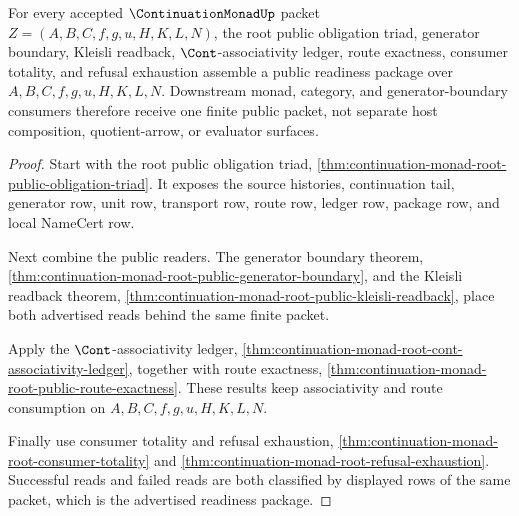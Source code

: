 \begin{theorem}
\label{thm:continuation-monad-root-public-readiness-package}
For every accepted $\ContinuationMonadUp$ packet
$Z=(A,B,C,f,g,u,H,K,L,N)$, the root public obligation triad, generator boundary,
Kleisli readback, $\Cont$-associativity ledger, route exactness, consumer
totality, and refusal exhaustion assemble a public readiness package over
$A,B,C,f,g,u,H,K,L,N$. Downstream monad, category, and generator-boundary
consumers therefore receive one finite public packet, not separate host
composition, quotient-arrow, or evaluator surfaces.
\end{theorem}
\begin{proof}
Start with the root public obligation triad,
\autoref{thm:continuation-monad-root-public-obligation-triad}. It exposes the
source histories, continuation tail, generator row, unit row, transport row,
route row, ledger row, package row, and local NameCert row.

Next combine the public readers. The generator boundary theorem,
\autoref{thm:continuation-monad-root-public-generator-boundary}, and the Kleisli
readback theorem, \autoref{thm:continuation-monad-root-public-kleisli-readback},
place both advertised reads behind the same finite packet.

Apply the $\Cont$-associativity ledger,
\autoref{thm:continuation-monad-root-cont-associativity-ledger}, together with
route exactness, \autoref{thm:continuation-monad-root-public-route-exactness}.
These results keep associativity and route consumption on
$A,B,C,f,g,u,H,K,L,N$.

Finally use consumer totality and refusal exhaustion,
\autoref{thm:continuation-monad-root-consumer-totality} and
\autoref{thm:continuation-monad-root-refusal-exhaustion}. Successful reads and
failed reads are both classified by displayed rows of the same packet, which is
the advertised readiness package.
\end{proof}

